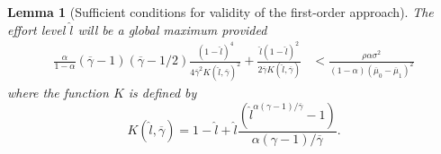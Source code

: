 \documentclass[11pt]{article}
\theoremstyle{plain}
\newtheorem{lemma}[thm]{Lemma}
\begin{document}
\begin{lemma}[Sufficient conditions for validity of the first-order approach] \label{suffFOC}
The effort level $\hat{l}$ will be a  global maximum provided 
\begin{equation}
\begin{aligned}
\frac{\alpha}{1-\alpha}(\overline{\gamma}-1)(\overline{\gamma}-1/2)\frac{(1-\hat{l})^4}{4\overline{\gamma}^2 K(\hat{l},\overline{\gamma})^2} + \frac{\hat{l}(1-\hat{l})^2}{2\overline{\gamma}K(\hat{l},\overline{\gamma})} & <  \frac{\rho \alpha \sigma^2}{(1-\alpha)(\overline{\mu}_0 - \overline{\mu}_1)^2}
\end{aligned}
\label{wantHIGH4}
\end{equation}
where the function $K$ is defined by 
\begin{equation}
K(\hat{l},\overline{\gamma}) = 1 - \hat{l} + \hat{l}\frac{(\hat{l}^{\alpha(\gamma-1)/\overline{\gamma}}-1)}{\alpha(\gamma-1)/\overline{\gamma}}.
\label{Kfunc}
\end{equation}
\end{lemma} 
\end{document}
